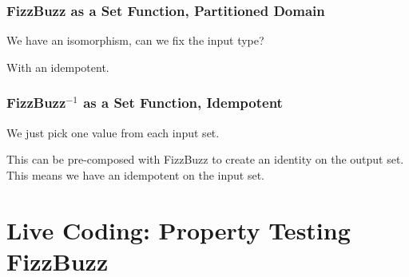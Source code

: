 \documentclass{beamer}
\begin{document}
\begin{frame}[fragile]
\frametitle{FizzBuzz as a Set Function, Partitioned Domain}
\medskip

We have an isomorphism, can we fix the input type? \\ \pause
\medskip

With an idempotent.
\end{frame}

\begin{frame}[fragile]
\frametitle{FizzBuzz{$^{-1}$} as a Set Function, Idempotent}

We just pick one value from each input set.

\medskip

This can be pre-composed with FizzBuzz to create an identity on the output set. \\
This means we have an idempotent on the input set. 

\end{frame}

\section{Live Coding: Property Testing FizzBuzz}
\end{document}
